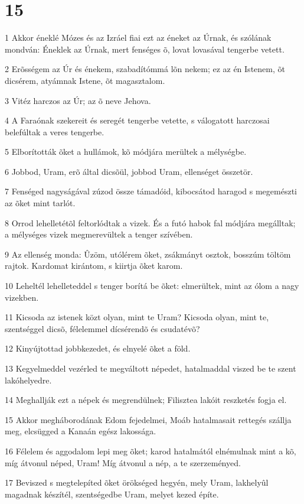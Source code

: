\chapter{15}

\par 1 Akkor éneklé Mózes és az Izráel fiai ezt az éneket az Úrnak, és szólának mondván: Éneklek az Úrnak, mert fenséges õ, lovat lovasával tengerbe vetett.
\par 2 Erõsségem az Úr és énekem, szabadítómmá lõn nekem; ez az én Istenem, õt dicsérem, atyámnak Istene, õt magasztalom.
\par 3 Vitéz harczos az Úr; az õ neve Jehova.
\par 4 A Faraónak szekereit és seregét tengerbe vetette, s válogatott harczosai belefúltak a veres tengerbe.
\par 5 Elborították õket a hullámok, kõ módjára merültek a mélységbe.
\par 6 Jobbod, Uram, erõ által dicsõül, jobbod Uram, ellenséget összetör.
\par 7 Fenséged nagyságával zúzod össze támadóid, kibocsátod haragod s megemészti az õket mint tarlót.
\par 8 Orrod lehelletétõl feltorlódtak a vizek. És a futó habok fal módjára megálltak; a mélységes vizek megmerevültek a tenger szívében.
\par 9 Az ellenség monda: Ûzöm, utólérem õket, zsákmányt osztok, bosszúm töltöm rajtok. Kardomat kirántom, s kiirtja õket karom.
\par 10 Leheltél lehelleteddel s tenger borítá be õket: elmerültek, mint az ólom a nagy vizekben.
\par 11 Kicsoda az istenek közt olyan, mint te Uram? Kicsoda olyan, mint te, szentséggel dicsõ, félelemmel dícsérendõ és csudatévõ?
\par 12 Kinyújtottad jobbkezedet, és elnyelé õket a föld.
\par 13 Kegyelmeddel vezérled te megváltott népedet, hatalmaddal viszed be te szent lakóhelyedre.
\par 14 Meghallják ezt a népek és megrendülnek; Filisztea lakóit reszketés fogja el.
\par 15 Akkor megháborodának Edom fejedelmei, Moáb hatalmasait rettegés szállja meg, elcsügged a Kanaán egész lakossága.
\par 16 Félelem és aggodalom lepi meg õket; karod hatalmától elnémulnak mint a kõ, míg átvonul néped, Uram! Míg átvonul a nép, a te szerzeményed.
\par 17 Beviszed s megtelepíted õket örökséged hegyén, mely Uram, lakhelyûl magadnak készítél, szentségedbe Uram, melyet kezed építe.
